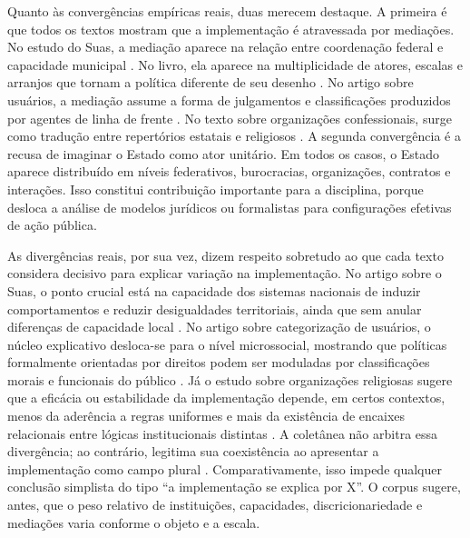 \documentclass[12pt,a4paper]{article}
\begin{document}
Quanto às convergências empíricas reais, duas merecem destaque. A primeira é que todos os textos mostram que a implementação é atravessada por mediações. No estudo do Suas, a mediação aparece na relação entre coordenação federal e capacidade municipal \parencite{bichir2020_sistemas_nacionais}. No livro, ela aparece na multiplicidade de atores, escalas e arranjos que tornam a política diferente de seu desenho \parencite{lotta2019_teorias_analises}. No artigo sobre usuários, a mediação assume a forma de julgamentos e classificações produzidos por agentes de linha de frente \parencite{lotta2020_categorizando_usuarios}. No texto sobre organizações confessionais, surge como tradução entre repertórios estatais e religiosos \parencite{lotta2023_jesus_speaks}. A segunda convergência é a recusa de imaginar o Estado como ator unitário. Em todos os casos, o Estado aparece distribuído em níveis federativos, burocracias, organizações, contratos e interações. Isso constitui contribuição importante para a disciplina, porque desloca a análise de modelos jurídicos ou formalistas para configurações efetivas de ação pública.

As divergências reais, por sua vez, dizem respeito sobretudo ao que cada texto considera decisivo para explicar variação na implementação. No artigo sobre o Suas, o ponto crucial está na capacidade dos sistemas nacionais de induzir comportamentos e reduzir desigualdades territoriais, ainda que sem anular diferenças de capacidade local \parencite{bichir2020_sistemas_nacionais}. No artigo sobre categorização de usuários, o núcleo explicativo desloca-se para o nível microssocial, mostrando que políticas formalmente orientadas por direitos podem ser moduladas por classificações morais e funcionais do público \parencite{lotta2020_categorizando_usuarios}. Já o estudo sobre organizações religiosas sugere que a eficácia ou estabilidade da implementação depende, em certos contextos, menos da aderência a regras uniformes e mais da existência de encaixes relacionais entre lógicas institucionais distintas \parencite{lotta2023_jesus_speaks}. A coletânea não arbitra essa divergência; ao contrário, legitima sua coexistência ao apresentar a implementação como campo plural \parencite{lotta2019_teorias_analises}. Comparativamente, isso impede qualquer conclusão simplista do tipo “a implementação se explica por X”. O corpus sugere, antes, que o peso relativo de instituições, capacidades, discricionariedade e mediações varia conforme o objeto e a escala.
\end{document}
